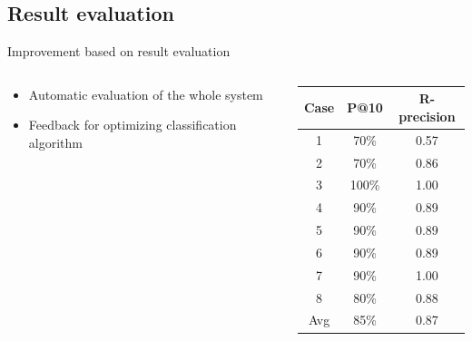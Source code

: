 \documentclass[screen, compress]{beamer}
\begin{document}
\subsection{Result evaluation}
\begin{frame}{Improvement based on result evaluation} %
\begin{columns}
\begin{column}[l]{6cm}
{ \Large
\begin{itemize}
	\item Automatic evaluation of the whole system
	\item Feedback for optimizing classification algorithm
\end{itemize}
}
\end{column}

\begin{column}[r]{5cm}
\begin{table}
\begin{tabular}{c c c}
    \toprule
    Case & P@10 & R-precision \\
    \midrule
	1 & 70\% & 0.57 \\
	2 & 70\% & 0.86 \\
	3 & 100\% & 1.00 \\
	4 & 90\% & 0.89 \\
	5 & 90\% & 0.89 \\
	6 & 90\% & 0.89 \\
	7 & 90\% & 1.00 \\
	8 & 80\% & 0.88 \\
    \midrule
	Avg & 85\% & 0.87 \\
	\bottomrule
\end{tabular}
\end{table}
\end{column}
\end{columns}
\end{frame}

\end{document}
